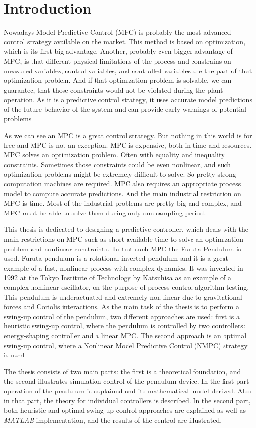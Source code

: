 \chapter{Introduction}
\label{ch:intro}
Nowadays Model Predictive Control (MPC) is probably the most advanced control strategy available on the market. This method is based on optimization, which is its first big advantage. Another, probably even bigger advantage of MPC, is that different physical limitations of the process and constrains on measured variables, control variables, and controlled variables are the part of that optimization problem. And if that optimization problem is solvable, we can guarantee, that those constraints would not be violated during the plant operation. As it is a predictive control strategy, it uses accurate model predictions of the future behavior of the system and can provide early warnings of potential problems.

As we can see an MPC is a great control strategy. But nothing in this world is for free and MPC is not an exception. MPC is expensive, both in time and resources. MPC solves an optimization problem. Often with equality and inequality constraints. Sometimes those constraints could be even nonlinear, and such optimization problems might be extremely difficult to solve. So pretty strong computation machines are required. MPC also requires an appropriate process model to compute accurate predictions. And the main industrial restriction on MPC is time. Most of the industrial problems are pretty big and complex, and MPC must be able to solve them during only one sampling period.

This thesis is dedicated to designing a predictive controller, which deals with the main restrictions on MPC such as short available time to solve an optimization problem and nonlinear constraints. To test such MPC the Furuta Pendulum is used. Furuta pendulum is a rotational inverted pendulum and it is a great example of a fast, nonlinear process with complex dynamics. It was invented in 1992 at the Tokyo Institute of Technology by Katsuhisa as an example of a complex nonlinear oscillator, on the purpose of process control algorithm testing. This pendulum is underactuated and extremely non-linear due to gravitational forces and Coriolis interactions. As the main task of the thesis is to perform a swing-up control of the pendulum, two different approaches are used: first is a heuristic swing-up control, where the pendulum is controlled by two controllers: energy-shaping controller and a linear MPC. The second approach is an optimal swing-up control, where a Nonlinear Model Predictive Control (NMPC) strategy is used.

The thesis consists of two main parts: the first is a theoretical foundation, and the second illustrates simulation control of the pendulum device. In the first part operation of the pendulum is explained and its mathematical model derived. Also in that part, the theory for individual controllers is described. In the second part, both heuristic and optimal swing-up control approaches are explained as well as \textit{MATLAB} implementation, and the results of the control are illustrated.   
